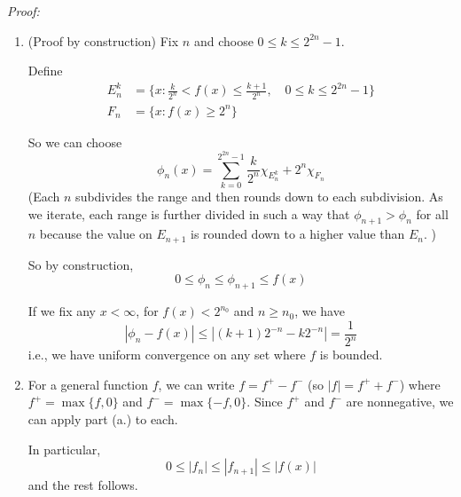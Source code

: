 \documentclass[12pt]{report}
\newcommand{\R}{\mathbb{R}}
\newcommand{\abs}[1]{\left\vert #1 \right\vert}
\newcommand{\M}{\mathcal{M}}
\newcommand{\X}{\chi}
\newenvironment*{tbox}[2][gray]{
    \begin{tcolorbox}[
        parbox=false,
        colback=#1!5!white,
        colframe=#1!75!black,
        breakable,
        title={#2}
    ]}
    {\end{tcolorbox}}
\begin{document}
    \begin{tbox}{\textbf{Theorem:} Let $(X, \M)$ be a measurable space
        \begin{enumerate}[label=(\alph*)]
            \item If $f: X \to [0, \infty]$ is measurable, then $\exists \{\phi_n\}$ of simple functions such that
            \[0 \leq \phi_1 \leq \phi_2 \leq \dots \leq f\] 
            Further, $\phi_n \to f$ pointwise on $X$ and uniformly on any set which $f$ is bounded.
            \item If $f: X \to \R$ is measurable, then $\exists \{\phi_n\}$ of simple functions such that 
            \[0 \leq \abs{\phi_1} \leq \abs{\phi_2} \leq \dots \leq \abs{f}\]
            and $\phi_n \to f$ pointwise on $X$ and uniformly on any set where $f$ is bounded.
        \end{enumerate}}
        \emph{Proof:} 

        \begin{enumerate}[label=(\alph*)]
            \item (Proof by construction) Fix $n$ and choose $0 \leq k \leq 2^{2n}  -1$. 
            
            Define 
            \begin{align*}
                E_n^k &= \{x: \frac{k}{2^n} < f(x) \leq \frac{k+1}{2^n}, \quad 0 \leq k \leq 2^{2n} - 1\}\\ 
                F_n &= \{x: f(x) \geq 2^n\}
            \end{align*}

            So we can choose
            \[\phi_n(x) = \sum_{k=0}^{2^{2n}  -1} \frac{k}{2^n} \X_{E_n^k} + 2^n \X_{F_n}\] 
            (Each $n$ subdivides the range and then rounds down to each subdivision. As we iterate, each range is further divided in such a way that $\phi_{n+1} > \phi_n$ for all $n$ because the value on $E_{n+1}$ is rounded down to a higher value than $E_n$. )

            So by construction, 
            \[0 \leq \phi_n \leq \phi_{n+1} \leq f(x)\]

            If we fix any $x < \infty$, for $f(x) < 2^{n_0}$ and $n \geq n_0$, we have 
            \[\abs{\phi_n - f(x)} \leq \abs{(k+1)2^{-n} - k2^{-n}} = \frac{1}{2^n}\]
            i.e., we have uniform convergence on any set where $f$ is bounded.

            \item For a general function $f$, we can write $f = f^+ - f^-$ (so $\abs{f} = f^+ + f^-$) where $f^+ = \max\{f, 0\}$ and $f^- = \max\{-f, 0\}$. Since $f^+$ and $f^-$ are nonnegative, we can apply part (a.) to each. 
            
            In particular, 
            \[0 \leq \abs{f_n} \leq \abs{f_{n+1}} \leq \abs{f(x)}\]
            and the rest follows. 
        \end{enumerate}
    \end{tbox}
\end{document}
